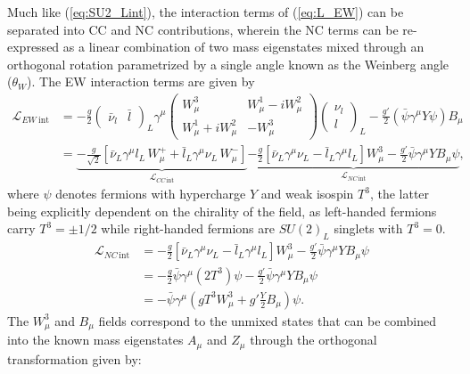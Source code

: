 Much like (\ref{eq:SU2_Lint}), the interaction terms of (\ref{eq:L_EW}) can be separated into CC and NC contributions, wherein the NC terms can be re-expressed as a linear combination of two mass eigenstates mixed through an orthogonal rotation parametrized by a single angle known as the Weinberg angle ($\theta_W$). The EW interaction terms are given by
\begin{equation}\label{eq:EW_Lint}
\begin{split}
\mathcal{L}_{EW~\text{int}} &= -\frac{g}{2}\begin{pmatrix}\bar{\nu}_l & \bar{l}\end{pmatrix}_L\gamma^\mu\begin{pmatrix} W^3_\mu & W^1_\mu - iW^2_\mu \\ W^1_\mu + iW^2_\mu & -W^3_\mu\end{pmatrix}\begin{pmatrix}\nu_l \\ l\end{pmatrix}_L - \frac{g'}{2}\left(\bar{\psi}\gamma^\mu Y \psi\right)B_\mu \\
&= \underbrace{-\frac{g}{\sqrt{2}}\left[\bar{\nu}_L\gamma^\mu l_L\, W^+_\mu + \bar{l}_L\gamma^\mu\nu_L\, W^-_\mu\right]}_{\mathcal{L}_{CC\,\text{int}}} \underbrace{- \frac{g}{2}\left[\bar{\nu}_L\gamma^\mu\nu_L - \bar{l}_L\gamma^\mu l_L\right]W^3_\mu - \frac{g'}{2}\bar{\psi}\gamma^\mu Y B_\mu\psi}_{\mathcal{L}_{NC\,\text{int}}},
\end{split}
\end{equation}
where $\psi$ denotes fermions with hypercharge $Y$ and weak isospin $T^3$, the latter being explicitly dependent on the chirality of the field, as left-handed fermions carry $T^3 = \pm 1/2$ while right-handed fermions are $SU(2)_L$ singlets with $T^3 = 0$.
\begin{equation}\label{eq:LNCint}
  \begin{split}
  \mathcal{L}_{NC\,\text{int}} &= - \frac{g}{2}\left[\bar{\nu}_L\gamma^\mu\nu_L - \bar{l}_L\gamma^\mu l_L\right]W^3_\mu - \frac{g'}{2}\bar{\psi}\gamma^\mu Y B_\mu\psi\\
  &= - \frac{g}{2} \bar{\psi} \gamma^{\mu} (2 T^3) \psi - \frac{g'}{2}\bar{\psi}\gamma^\mu Y B_\mu\psi\\
  &= -\bar{\psi}\gamma^\mu(gT^3W^3_{\mu} + g' \frac{Y}{2}B_\mu)\psi.
  \end{split}
\end{equation}
The $W^3_\mu$ and $B_\mu$ fields correspond to the unmixed states that can be combined into the known mass eigenstates $A_\mu$ and $Z_\mu$ through the orthogonal transformation given by:
